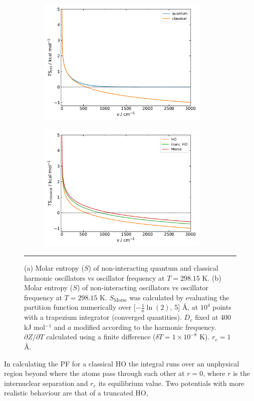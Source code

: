 \documentclass[../main.tex]{subfiles}
\begin{document}
\begin{figure}[h!]
	
	\centering
	\begin{subfigure}[b]{0.49\textwidth}
		\includegraphics[width=8.2cm]{4/figs/fig_s_vs_nu/s_vs_n.pdf}
			\caption{}
	\end{subfigure}
	\hfill
	\begin{subfigure}[b]{0.49\textwidth}
		\includegraphics[width=8.2cm]{4/figs/fig_s_vs_nu/s_vs_nu_trunc_morse.pdf}
		\caption{}
	\end{subfigure}
	\vspace{0.2cm}
	\hrule
	\caption{(a) Molar entropy ($S$) of non-interacting quantum and classical harmonic oscillators vs oscillator frequency at $T = 298.15 $ K. (b) Molar entropy ($S$) of non-interacting oscillators vs oscillator frequency at $T = 298.15 $ K. $S_\text{Morse}$ was calculated by evaluating the partition function numerically over [$-\frac{1}{a}\ln(2)$, 5] \AA, at $10^4$ points with a trapezium integrator (converged quantities). $D_e$  fixed at 400 kJ mol$^{-1}$ and $a$ modified according to the harmonic frequency. $\partial Z / \partial T$ calculated using a finite difference ($\delta T = 1 \times10^{-8}$ K).  $r_e = 1$ \AA.}
	\label{s_vs_nu}
\end{figure}

In calculating the PF for a classical HO the integral runs over an unphysical region beyond where the atoms pass through each other at $r = 0$, where $r$ is the internuclear separation and $r_e$ its equilibrium value. Two potentials with more realistic behaviour are that of a truncated HO,
\end{document}
